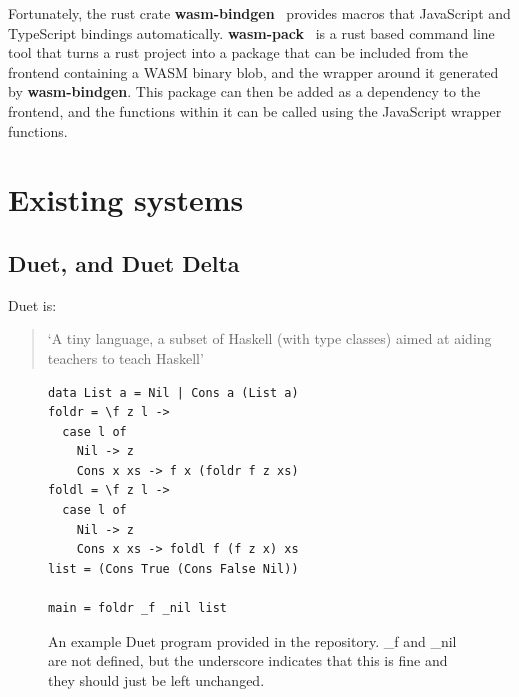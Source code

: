 Fortunately, the rust crate \textbf{wasm-bindgen}~\cite{wasm_bindgen_guide} provides macros that JavaScript and TypeScript bindings automatically. \textbf{wasm-pack}~\cite{wasm_pack_guide} is a rust based command line tool that turns a rust project into a package that can be included from the frontend containing a \ac{WASM} binary blob, and the wrapper around it generated by \textbf{wasm-bindgen}. This package can then be added as a dependency to the frontend, and the functions within it can be called using the JavaScript wrapper functions. 

\section{Existing systems}

\subsection{Duet, and Duet Delta}
\label{bg:duet}
Duet is:

\begin{quotation}
\noindent `A tiny language, a subset of Haskell (with type classes) aimed at aiding teachers to teach Haskell'~\cite{duet_hackage}
\end{quotation}

\begin{figure}[h]
    \begin{lstlisting}[language=SFL_noprelude]
data List a = Nil | Cons a (List a)
foldr = \f z l ->
  case l of
    Nil -> z
    Cons x xs -> f x (foldr f z xs)
foldl = \f z l ->
  case l of
    Nil -> z
    Cons x xs -> foldl f (f z x) xs
list = (Cons True (Cons False Nil))

main = foldr _f _nil list
\end{lstlisting}
    \caption{An example Duet program provided in the repository. \_f and \_nil are not defined, but the underscore indicates that this is fine and they should just be left unchanged. }
    \label{bg:duet_foldr}
\end{figure}

